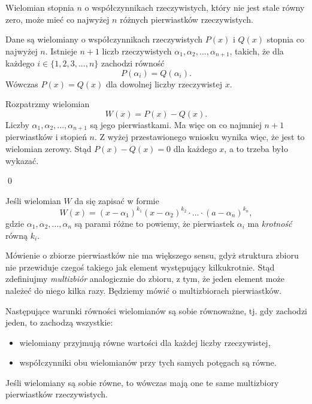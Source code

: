 \vspace{5px}


\noindent
Wielomian stopnia $n$ o współczynnikach rzeczywistych, który nie jest stale równy zero, może mieć co najwyżej $n$ różnych pierwiastków rzeczywistych.


\vspace{5px} 



\noindent
Dane są wielomiany o współczynnikach rzeczywistych $P(x)$ i $Q(x)$ stopnia co najwyżej $n$. Istnieje $n + 1$ liczb rzeczywistych $\alpha_1, \alpha_2, ..., \alpha_{n + 1}$, takich, że dla każdego $i \in \{1, 2, 3, ..., n\}$ zachodzi równość 
\[
    P(\alpha_i) = Q(\alpha_i).
\]
Wówczas $P(x) = Q(x)$ dla dowolnej liczby rzeczywistej $x$.

\vspace{5px}


\noindent
Rozpatrzmy wielomian 
\[
    W(x) = P(x) - Q(x).
\]
Liczby $\alpha_1, \alpha_2, ..., \alpha_{n + 1}$ są jego pierwiastkami. Ma więc on co najmniej $n + 1$ pierwiastków i stopień $n$. Z wyżej przestawionego wniosku wynika więc, że jest to wielomian zerowy. Stąd $P(x) - Q(x) = 0$ dla każdego $x$, a to trzeba było wykazać.

\qed


\noindent
Jeśli wielomian $W$ da się zapisać w formie
\[
    W(x) = (x - \alpha_1)^{k_1}(x - \alpha_2)^{k_2} \cdot ... \cdot (a - \alpha_n)^{k_n},
\]
gdzie $\alpha_1, \alpha_2, ..., \alpha_{n}$ są parami różne to powiemy, że pierwiastek $\alpha_i$ ma \textit{krotność} równą $k_i$. 

\vspace{10px}
\noindent
Mówienie o zbiorze pierwiastków nie ma większego sensu, gdyż struktura zbioru nie przewiduje czegoś takiego jak element występujący kilkukrotnie. Stąd zdefiniujmy \textit{multizbiór} analogicznie do zbioru, z tym, że jeden element może należeć do niego kilka razy. Będziemy mówić o multizbiorach pierwiastków.

\vspace{5px}


\noindent
Następujące warunki równości wielomianów są sobie równoważne, tj. gdy zachodzi jeden, to zachodzą wszystkie:
\begin{itemize}
    \item wielomiany przyjmują równe wartości dla każdej liczby rzeczywistej,
    \item współczynniki obu wielomianów przy tych samych potęgach są równe.
\end{itemize}
Jeśli wielomiany są sobie równe, to wówczas mają one te same multizbiory pierwiastków rzeczywistych.

